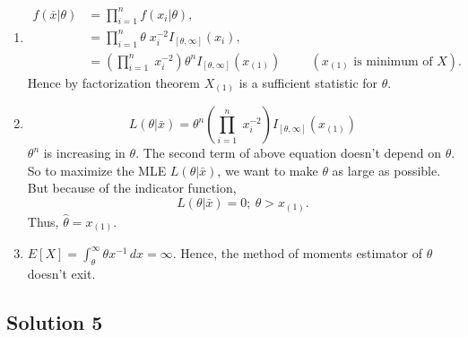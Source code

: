 \documentclass[a4paper,english,12pt]{article}
\begin{document}
\begin{enumerate}[label=(\alph*).]
\item 
\begin{align*}
f(\bar{x}|\theta)&= \prod_{i=1}^{n} f(x_i|\theta),\\
&=\prod_{i=1}^{n} \theta\;x_{i}^{-2} I_{[\theta,\infty]}(x_{i}),\\
&=(\prod_{i=1}^{n} \;x_{i}^{-2})\theta^{n}I_{[\theta,\infty]}(x_{(1)}) \hspace{1cm} ( x_{(1)} \mbox{ is minimum of } X).
\end{align*}
Hence by factorization theorem $X_{(1)}$ is a sufficient statistic for $\theta$.
\item 
\begin{equation*}
L(\theta|\bar{x}) = \theta^{n}(\prod_{i=1}^{n} \;x_{i}^{-2})I_{[\theta,\infty]}(x_{(1)})
\end{equation*}
$\theta^{n}$ is increasing in $\theta$. The second term of above equation doesn't depend on $\theta$. So to maximize the MLE $L(\theta|\bar x)$, we want to make $\theta$ as large as possible. But because of the indicator function,
\begin{equation*}
L(\theta|\bar x) = 0 ;~\theta>x_{(1)}.
\end{equation*}
Thus, $\hat{\theta} = x_{(1)}$.
\item $E[X] = \int_\theta^{\infty}\theta x^{-1}\,dx = \infty $. Hence, the method of moments estimator of $ \theta $  doesn't exit.
\end{enumerate}
\hypertarget{solution5}{\subsection*{Solution 5}}
\end{document}
